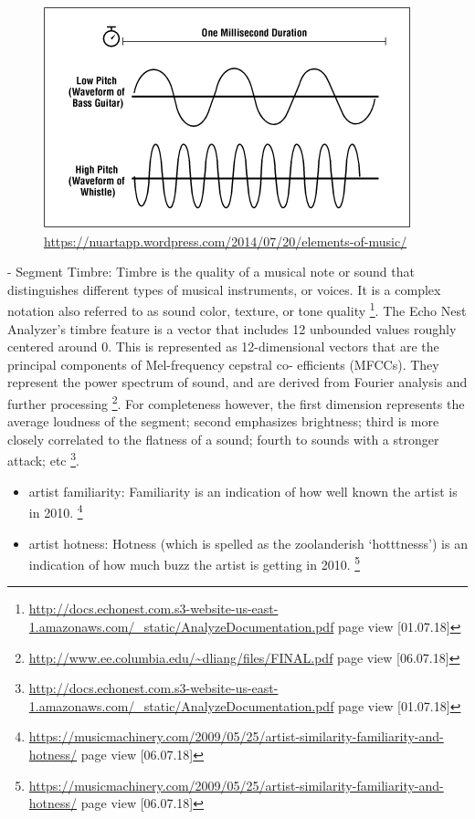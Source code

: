\documentclass[]{article}
\providecommand{\tightlist}{%
  \setlength{\itemsep}{0pt}\setlength{\parskip}{0pt}}
\let\rmarkdownfootnote\footnote%
\def\footnote{\protect\rmarkdownfootnote}
\begin{document}
\begin{figure}
\centering
\includegraphics{./picturesDocu/pitch.gif}
\caption{\url{https://nuartapp.wordpress.com/2014/07/20/elements-of-music/}}
\end{figure}

 - Segment Timbre: Timbre is the quality of a musical note or sound that
distinguishes different types of musical instruments, or voices. It is a
complex notation also referred to as sound color, texture, or tone
quality \footnote{\url{http://docs.echonest.com.s3-website-us-east-1.amazonaws.com/_static/AnalyzeDocumentation.pdf}
  page view {[}01.07.18{]}}. The Echo Nest Analyzer's timbre feature is
a vector that includes 12 unbounded values roughly centered around 0.
This is represented as 12-dimensional vectors that are the principal
components of Mel-frequency cepstral co- efficients (MFCCs). They
represent the power spectrum of sound, and are derived from Fourier
analysis and further processing \footnote{\url{http://www.ee.columbia.edu/~dliang/files/FINAL.pdf}
  page view {[}06.07.18{]}}. For completeness however, the first
dimension represents the average loudness of the segment; second
emphasizes brightness; third is more closely correlated to the flatness
of a sound; fourth to sounds with a stronger attack; etc \footnote{\url{http://docs.echonest.com.s3-website-us-east-1.amazonaws.com/_static/AnalyzeDocumentation.pdf}
  page view {[}01.07.18{]}}.

\begin{itemize}
\tightlist
\item
  artist familiarity: Familiarity is an indication of how well known the
  artist is in 2010. \footnote{\url{https://musicmachinery.com/2009/05/25/artist-similarity-familiarity-and-hotness/}
    page view {[}06.07.18{]}}
\item
  artist hotness: Hotness (which is spelled as the zoolanderish
  `hotttnesss') is an indication of how much buzz the artist is getting
  in 2010. \footnote{\url{https://musicmachinery.com/2009/05/25/artist-similarity-familiarity-and-hotness/}
    page view {[}06.07.18{]}}
\end{itemize}
\end{document}

